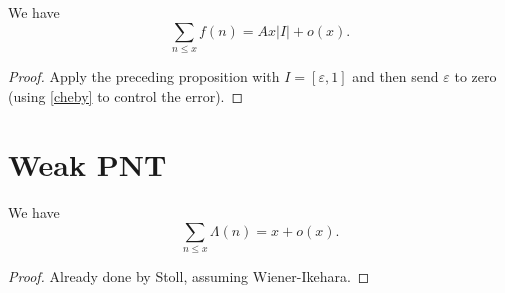 \begin{corollary}\label{WienerIkehara}\leanok
  We have
$$ \sum_{n\leq x} f(n) = A x |I|  + o(x).$$
\end{corollary}


\begin{proof}
  Apply the preceding proposition with $I = [\varepsilon,1]$ and then send $\varepsilon$ to zero (using \eqref{cheby} to control the error).
\end{proof}


\section{Weak PNT}

\begin{theorem}\label{WeakPNT}\leanok  We have
$$ \sum_{n \leq x} \Lambda(n) = x + o(x).$$
\end{theorem}


\begin{proof}
  Already done by Stoll, assuming Wiener-Ikehara.
\end{proof}

